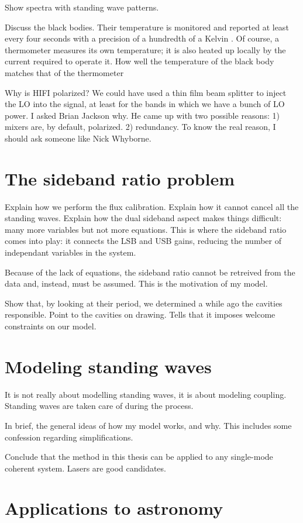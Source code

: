 Show spectra with standing wave patterns.


Discuss the black bodies.  Their temperature is monitored and reported at least every four seconds with a precision of a hundredth of a Kelvin .
Of course, a thermometer measures its own temperature; it is also heated up locally by the current required to operate it.
How well the temperature of the black body matches that of the thermometer 


Why is HIFI polarized?
We could have used a thin film beam splitter to inject the LO into the signal, at least for the bands in which we have a bunch of LO power.
I asked Brian Jackson why.
He came up with two possible reasons:
1) mixers are, by default, polarized.
2) redundancy.
To know the real reason, I should ask someone like Nick Whyborne.



\section{The sideband ratio problem}

Explain how we perform the flux calibration.
Explain how it cannot cancel all the standing waves.
Explain how the dual sideband aspect makes things difficult: many more variables but not more equations.
This is where the sideband ratio comes into play: it connects the LSB and USB gains, reducing the number of independant variables in the system.

Because of the lack of equations, the sideband ratio cannot be retreived from the data and, instead, must be assumed.
This is the motivation of my model.

Show that, by looking at their period, we determined a while ago the cavities responsible.
Point to the cavities on drawing.
Tells that it imposes welcome constraints on our model.



\section{Modeling standing waves}
It is not really about modelling standing waves, it is about modeling coupling.
Standing waves are taken care of during the process.

In brief, the general ideas of how my model works, and why.
This includes some confession regarding simplifications.

Conclude that the method in this thesis can be applied to any single-mode coherent system.
Lasers are good candidates.



\section{Applications to astronomy}
